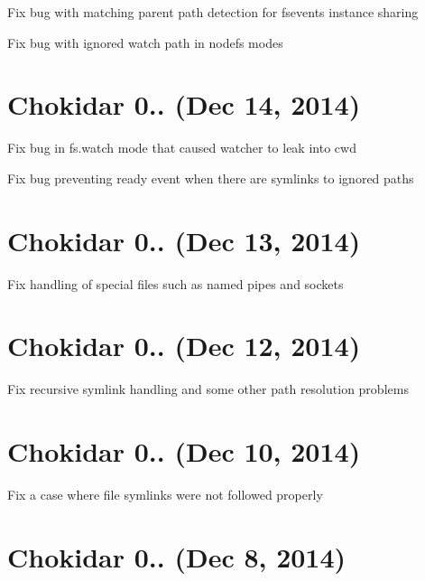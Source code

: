 \begin{DoxyItemize}
\item Fix bug with matching parent path detection for fsevents instance sharing
\item Fix bug with ignored watch path in nodefs modes
\end{DoxyItemize}

\section*{Chokidar 0.. (Dec 14, 2014)}


\begin{DoxyItemize}
\item Fix bug in {\ttfamily fs.\+watch} mode that caused watcher to leak into {\ttfamily cwd}
\item Fix bug preventing ready event when there are symlinks to ignored paths
\end{DoxyItemize}

\section*{Chokidar 0.. (Dec 13, 2014)}


\begin{DoxyItemize}
\item Fix handling of special files such as named pipes and sockets
\end{DoxyItemize}

\section*{Chokidar 0.. (Dec 12, 2014)}


\begin{DoxyItemize}
\item Fix recursive symlink handling and some other path resolution problems
\end{DoxyItemize}

\section*{Chokidar 0.. (Dec 10, 2014)}


\begin{DoxyItemize}
\item Fix a case where file symlinks were not followed properly
\end{DoxyItemize}

\section*{Chokidar 0.. (Dec 8, 2014)}



